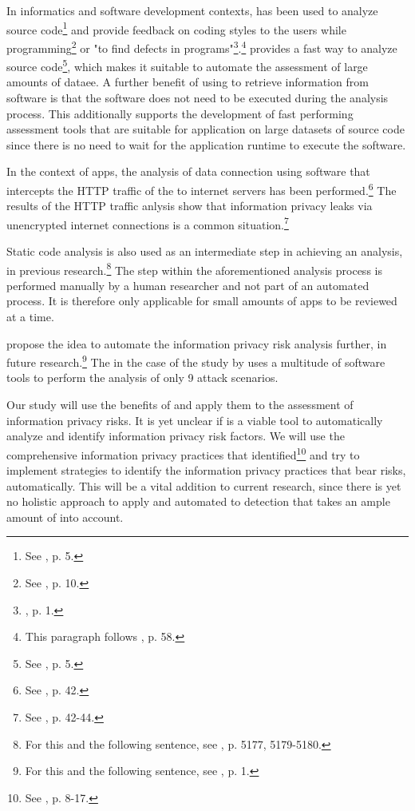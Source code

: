 In informatics and software development contexts, \sca has been used to analyze source code\footnote{See \cite{Haris2014}, p.  5.} and provide feedback on coding styles to the users while programming\footnote{See \cite{Bardas2010}, p. 10.} or "to find defects in programs"\footnote{\cite{Bardas2010}, p. 1.}.\footnote{This paragraph follows \cite{Louridas2006}, p. 58.}
\Sca provides a fast way to analyze source code\footnote{See \cite{Bardas2010}, p. 5.}, which makes it suitable to automate the assessment of large amounts of dataee.
A further benefit of using \sca to retrieve information from software is that the software does not need to be executed during the analysis process.
This additionally supports the development of fast performing assessment tools that are suitable for application on large datasets of source code since there is no need to wait for the application runtime to execute the software.

In the context of \mH apps, the analysis of data connection using software that intercepts the HTTP traffic of the \mH to internet servers has been performed.\footnote{See \cite{Mense2015}, p. 42.}
The results of the HTTP traffic anlysis show that information privacy leaks via unencrypted internet connections is a common situation.\footnote{See \cite{Mense2015}, p. 42-44.}

Static code analysis is also used as an intermediate step in achieving an \ipr analysis, in previous research.\footnote{For this and the following sentence, see \cite{Dorazio2015}, p. 5177, 5179-5180.}
The \sca step within the aforementioned analysis process is performed manually by a human researcher and not part of an automated process.
It is therefore only applicable for small amounts of apps to be reviewed at a time.

\textcite{Knorr2015} propose the idea to automate the information privacy risk analysis further, in future research.\footnote{For this and the following sentence, see \cite{Knorr2015}, p. 1.}
The \sca in the case of the study by \textcite{Knorr2015} uses a multitude of software tools to perform the analysis of only 9 attack scenarios.

Our study will use the benefits of \sca and apply them to the assessment of \mH information privacy risks.
It is yet unclear if \sca is a viable tool to automatically analyze and identify information privacy risk factors.
We will use the comprehensive information privacy practices that \cite{Dehling2016} identified\footnote{See \cite{Dehling2016}, p. 8-17.} and try to implement \sca strategies to identify the information privacy practices that bear risks, automatically.
This will be a vital addition to current research, since there is yet no holistic approach to apply and automated \sca to \ipr detection that takes an ample amount of \iprfs into account.

